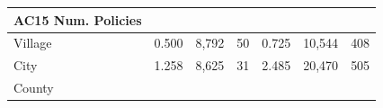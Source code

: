 \documentclass[]{book}
\theoremstyle{definition}
\theoremstyle{definition}
\theoremstyle{definition}
\theoremstyle{remark}
\begin{document}
\begin{longtable}[]{@{}lrcrrrr@{}}
\begin{minipage}[b]{0.11\columnwidth}
AC15 Num. Policies\strut
\end{minipage}\tabularnewline
\midrule
\endhead
\begin{minipage}[t]{0.10\columnwidth}\raggedright\strut
Village\strut
\end{minipage} & \begin{minipage}[t]{0.12\columnwidth}\raggedleft\strut
0.500\strut
\end{minipage} & \begin{minipage}[t]{0.11\columnwidth}\centering\strut
8,792\strut
\end{minipage} & \begin{minipage}[t]{0.11\columnwidth}\raggedleft\strut
50\strut
\end{minipage} & \begin{minipage}[t]{0.12\columnwidth}\raggedleft\strut
0.725\strut
\end{minipage} & \begin{minipage}[t]{0.11\columnwidth}\raggedleft\strut
10,544\strut
\end{minipage} & \begin{minipage}[t]{0.11\columnwidth}\raggedleft\strut
408\strut
\end{minipage}\tabularnewline
\begin{minipage}[t]{0.10\columnwidth}\raggedright\strut
City\strut
\end{minipage} & \begin{minipage}[t]{0.12\columnwidth}\raggedleft\strut
1.258\strut
\end{minipage} & \begin{minipage}[t]{0.11\columnwidth}\centering\strut
8,625\strut
\end{minipage} & \begin{minipage}[t]{0.11\columnwidth}\raggedleft\strut
31\strut
\end{minipage} & \begin{minipage}[t]{0.12\columnwidth}\raggedleft\strut
2.485\strut
\end{minipage} & \begin{minipage}[t]{0.11\columnwidth}\raggedleft\strut
20,470\strut
\end{minipage} & \begin{minipage}[t]{0.11\columnwidth}\raggedleft\strut
505\strut
\end{minipage}\tabularnewline
\begin{minipage}[t]{0.10\columnwidth}\raggedright\strut
County\strut
\end{minipage} & \begin{minipage}[t]{0.12\columnwidth}\raggedleft\strut

\end{minipage}
\end{longtable}
\end{document}
